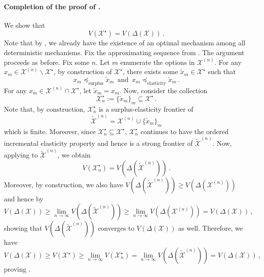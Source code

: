 \documentclass[12pt,letterpaper]{article}
\newenvironment{original}{\color{black}\noindent}{}
\theoremstyle{plain}
\theoremstyle{definition}
\theoremstyle{remark}
\renewcommand{\1}{\mathds{1}}
\newcommand{\X}{\mathcal{X}}
\theoremstyle{definition}
\begin{document}
\paragraph{Completion of the proof of .}\hspace{-2mm}\begin{original}We show that
\[V(\X^\star) = V(\Delta(\X))\,.\]
Note that by , we already have the existence of an optimal mechanism among all deterministic mechanisms. Fix the approximating sequence from . The argument proceeds as before. Fix some $n$. Let $m$ enumerate the options in $\X^{(n)}$. For any $x_m \in \X^{(n)} \backslash \X^\star$, by construction of $\X^\star$, there exists some $\tilde{x}_m \in \X^\star$ such that
\[x_m \preceq_{\text{surplus}} \tilde{x}_m \,\text{ and }\, x_m \preceq_{\text{elasticity}} \tilde{x}_m\,.\]
For any $x_m \in \X^{(n)} \cap \X^\star$, let $\tilde{x}_m = x_m$. Now, consider the collection
\[\X^\star_n := \{\tilde{x}_m\}_m \subseteq \X^\star\,.\]
Note that, by construction, $\X^\star_n$ is a surplus-elasticity frontier of
\[\tilde{\X}^{(n)}= \X^{(n)} \cup \{\tilde{x}_m\}_m\]
which is finite. Moreover, since $\X^\star_n \subseteq \X^\star$,  $\X^\star_n$ continues to have the ordered incremental elasticity property and hence is a strong frontier of $\tilde{\X}^{(n)}$. Now, applying  to $\tilde{\X}^{(n)}$, we obtain
\[V(\X^\star_n) = V(\Delta(\tilde{\X}^{(n)}))\,.\]
Moreover, by construction, we also have
$V(\Delta(\tilde{\X}^{(n)})) \geq V(\Delta(\X^{(n)})) $
and hence by 
\[V(\Delta(\X)) \geq \displaystyle\lim_{n\rightarrow \infty}V(\Delta(\tilde{\X}^{(n)})) \geq \displaystyle\lim_{n\rightarrow \infty}V(\Delta(\X^{(n)})) = V(\Delta(\X))\,,\]
showing that $V(\Delta(\tilde{\X}^{(n)}))$ converges to $V(\Delta(\X))$ as well. Therefore, we have
\[ V(\Delta(\X)) \geq V(\X^\star) \geq \lim_{n\rightarrow \infty } V(\X^\star_n) = \lim_{n\rightarrow \infty }V(\Delta(\tilde{\X}^{(n)}))  =  V(\Delta(\X))\,,\]
proving .
\end{original}
\end{document}
